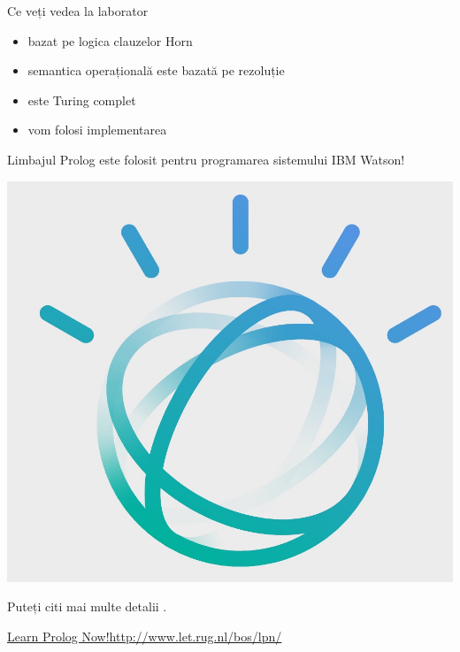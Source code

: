 \documentclass[xcolor=x11names,compress,10pt]{beamer}
\begin{document}
\begin{frame}{Ce veți vedea la laborator}
\medskip 

\begin{itemize}
	\item bazat pe logica clauzelor Horn
	\item semantica operațională este bazată pe rezoluție
	\item este Turing complet
	\item vom folosi implementarea 
\end{itemize}
\pause\medskip

\begin{block}{}
Limbajul Prolog este folosit pentru programarea sistemului IBM Watson!
\begin{center}
\includegraphics[scale=0.05]{img/watson}
\end{center}
Puteți citi mai multe detalii   \href{https://www.cs.nmsu.edu/ALP/2011/03/natural-language-processing-with-prolog-in-the-ibm-watson-system/}{}.
\end{block}

\underline{Learn Prolog Now!\url{http://www.let.rug.nl/bos/lpn/}}
\end{frame}
\end{document}
